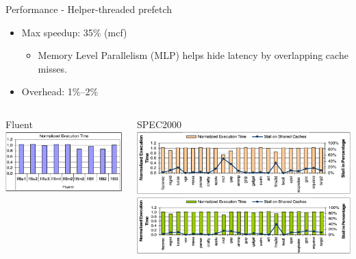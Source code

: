 \documentclass[aspectratio=169,xcolor=x11names]{beamer}
\begin{document}
	\begin{frame}{Performance - Helper-threaded prefetch}
		\begin{itemize}
			\item Max speedup: 35\% (\alert{mcf})
			\begin{itemize}
				\item Memory Level Parallelism (MLP) helps hide latency by overlapping cache misses.
			\end{itemize}
			\item Overhead: 1\%--2\%
		\end{itemize}
		\begin{columns}
			\begin{column}[T]{0.4\linewidth}
				\begin{alertblock}{Fluent}
					\includegraphics[width=\textwidth]{ADORE2-fluent}
				\end{alertblock}
			\end{column}
			\begin{column}[T]{0.6\linewidth}
				\begin{alertblock}{SPEC2000}
					\includegraphics[width=\textwidth]{ADORE2-SPEC-base}\\
					\includegraphics[width=\textwidth]{ADORE2-SPEC-peak}
				\end{alertblock}
			\end{column}
		\end{columns}
	\end{frame}
\end{document}
